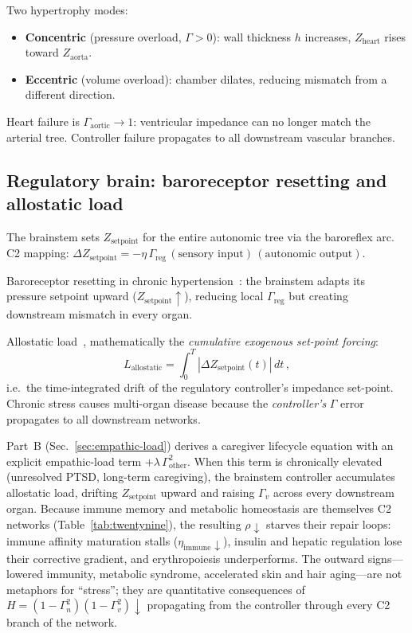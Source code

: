 \documentclass[aps,pre,twocolumn,superscriptaddress,floatfix]{revtex4-2}
\begin{document}
Two hypertrophy modes:
\begin{itemize}
  \item \textbf{Concentric} (pressure overload,
    $\Gamma > 0$): wall thickness $h$ increases,
    $Z_{\text{heart}}$ rises toward $Z_{\text{aorta}}$.
  \item \textbf{Eccentric} (volume overload):
    chamber dilates, reducing mismatch from a
    different direction.
\end{itemize}
Heart failure is $\Gamma_{\text{aortic}} \to 1$:
ventricular impedance can no longer match the
arterial tree.  Controller failure propagates to
all downstream vascular branches.

\subsection{Regulatory brain: baroreceptor resetting and
allostatic load}

The brainstem sets $Z_{\text{setpoint}}$ for the
entire autonomic tree via the baroreflex arc.
C2 mapping:
$\Delta Z_{\text{setpoint}} = -\eta\,\Gamma_{\text{reg}}
\,(\text{sensory input})\,(\text{autonomic output})$.

Baroreceptor resetting in chronic
hypertension~\cite{Chapleau1991}:
the brainstem adapts its pressure setpoint upward
($Z_{\text{setpoint}} \uparrow$), reducing local
$\Gamma_{\text{reg}}$ but creating downstream mismatch
in every organ.

Allostatic load~\cite{McEwen1998},
mathematically the \emph{cumulative exogenous
set-point forcing}:
\begin{equation}
  L_{\text{allostatic}} = \int_0^T
  |\Delta Z_{\text{setpoint}}(t)|\,dt\,,
  \label{eq:allostatic}
\end{equation}
i.e.\ the time-integrated drift of the regulatory
controller's impedance set-point.
Chronic stress causes multi-organ disease because
the \emph{controller's} $\Gamma$ error propagates
to all downstream networks.

\begin{remark}
\label{rem:trauma-somatic-ctrl}
Part~B (Sec.~\ref{sec:empathic-load}) derives a caregiver
lifecycle equation
with an explicit empathic-load term
$+\lambda\,\Gamma_{\text{other}}^2$.
When this term is chronically elevated (unresolved PTSD,
long-term caregiving), the brainstem controller
accumulates allostatic load, drifting
$Z_{\text{setpoint}}$ upward and raising
$\Gamma_v$ across every downstream organ.
Because immune memory and metabolic homeostasis are
themselves C2 networks
(Table~\ref{tab:twentynine}),
the resulting $\rho\!\downarrow$ starves their
repair loops:
immune affinity maturation stalls
($\eta_{\text{immune}}\!\downarrow$),
insulin and hepatic regulation lose their corrective
gradient, and erythropoiesis underperforms.
The outward signs---lowered immunity, metabolic syndrome,
accelerated skin and hair aging---are not metaphors for
``stress''; they are quantitative consequences of
$H = (1-\Gamma_n^2)(1-\Gamma_v^2)\!\downarrow$
propagating from the controller through every C2
branch of the network.
\end{remark}
\end{document}
